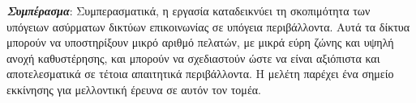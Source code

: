\documentclass[12pt]{article}
\begin{document}
\begin{multicols}{2}
    \textit{\textbf{Συμπέρασμα}}: Συμπερασματικά, η εργασία καταδεικνύει τη σκοπιμότητα των υπόγειων ασύρματων δικτύων επικοινωνίας σε υπόγεια περιβάλλοντα. Αυτά τα δίκτυα μπορούν να υποστηρίξουν μικρό αριθμό πελατών, με μικρά εύρη ζώνης και υψηλή ανοχή καθυστέρησης, και μπορούν να σχεδιαστούν ώστε να είναι αξιόπιστα και αποτελεσματικά σε τέτοια απαιτητικά περιβάλλοντα. Η μελέτη παρέχει ένα σημείο εκκίνησης για μελλοντική έρευνα σε αυτόν τον τομέα.
\end{multicols}

\printbibliography %
\end{document}
